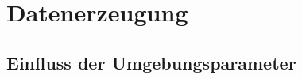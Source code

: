 \chapter{Datenerzeugung}
\label{ch:Datenerzeugung}

\section{Einfluss der Umgebungsparameter}
\label{sec:Datenerzeugung_Umgebung}


